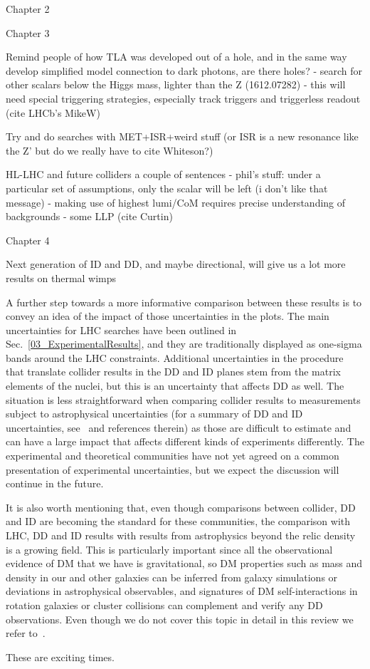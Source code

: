 Chapter 2




Chapter 3

Remind people of how TLA was developed out of a hole, and in the same way develop simplified model connection to dark photons, are there holes?
- search for other scalars below the Higgs mass, lighter than the Z (1612.07282)
- this will need special triggering strategies, especially track triggers and triggerless readout (cite LHCb's MikeW)

Try and do searches with MET+ISR+weird stuff (or ISR is a new resonance like the Z' but do we really have to cite Whiteson?)

HL-LHC and future colliders a couple of sentences
- phil's stuff: under a particular set of assumptions, only the scalar will be left (i don't like that message)
- making use of highest lumi/CoM requires precise understanding of backgrounds
- some LLP (cite Curtin)

Chapter 4

Next generation of ID and DD, and maybe directional, will give us a lot more results on thermal wimps

A further step towards a more informative comparison between these results is to convey an idea of the impact of those uncertainties in the plots. 
The main uncertainties for LHC searches have been outlined in Sec.~\ref{03_ExperimentalResults}, and they are traditionally displayed as one-sigma bands around the LHC constraints. 
Additional uncertainties in the procedure that translate collider results in the DD and ID planes stem from the matrix elements of the nuclei, but this is an uncertainty that
affects DD as well. %
The situation is less straightforward when comparing collider results to measurements subject to astrophysical uncertainties (for a summary of DD and ID uncertainties, see~\cite{Feldstein:2014ufa,d300ef23986a49099715e661295a4d72} and references therein) as those are difficult to estimate and can have a large impact that affects different kinds of experiments differently. 
The experimental and theoretical communities have not yet agreed on a common presentation of experimental uncertainties, but we expect the discussion will continue in the future. 


It is also worth mentioning that, even though comparisons between collider, DD and ID are becoming the standard for these communities,
the comparison with LHC, DD and ID results with results from astrophysics beyond the relic density is a growing field. 
This is particularly important since all the observational evidence of DM that we have is gravitational,
so DM properties such as mass and density in our and other galaxies
can be inferred from galaxy simulations or deviations in astrophysical observables, 
and signatures of DM self-interactions in rotation galaxies or cluster collisions can complement and verify any DD 
observations. Even though we do not cover this topic in detail in this review we refer to~\cite{Buckley:2017ijx}. 



These are exciting times. %